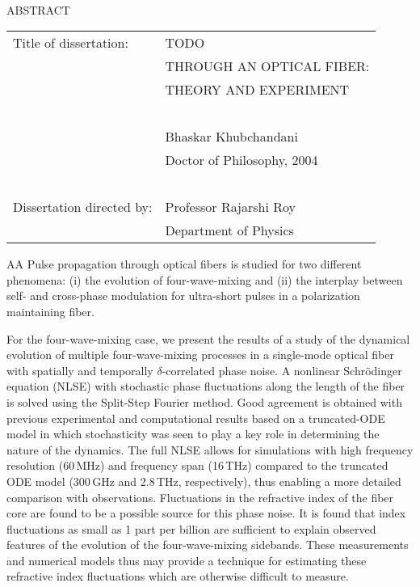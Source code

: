 
\hbox{\ }

\renewcommand{\baselinestretch}{1}
\small \normalsize

\begin{center}
\large{{ABSTRACT}}

\vspace{3em}

\end{center}
\hspace{-.15in}
\begin{tabular}{ll}
Title of dissertation:    & {\large  TODO }\\
&                     {\large  THROUGH AN OPTICAL FIBER:} \\
&                     {\large  THEORY AND EXPERIMENT} \\
\ \\
&                          {\large  Bhaskar Khubchandani} \\
&                           {\large Doctor of Philosophy, 2004} \\
\ \\
Dissertation directed by: & {\large  Professor Rajarshi Roy} \\
&               {\large  Department of Physics } \\
\end{tabular}

\vspace{3em}

\renewcommand{\baselinestretch}{2}
\large \normalsize

AA Pulse propagation through optical fibers is studied for two different phenomena: (i) the evolution of four-wave-mixing and (ii) the interplay between self- and cross-phase modulation for ultra-short pulses in a polarization maintaining fiber.

For the four-wave-mixing case, we present the results of a study of the dynamical evolution of multiple four-wave-mixing processes in a single-mode optical fiber with spatially and temporally $\delta$-correlated phase noise. A nonlinear Schr\"odinger equation (NLSE) with stochastic phase fluctuations along the length of the fiber is solved using the Split-Step Fourier method. Good agreement is obtained with previous experimental and computational results based on a truncated-ODE model in which stochasticity was seen to play a key role in determining the nature of the dynamics. The full NLSE allows for simulations with high frequency resolution (60\,MHz) and frequency span (16\,THz) compared to the truncated ODE model (300\,GHz and 2.8\,THz, respectively), thus enabling a more detailed comparison with observations. Fluctuations in the refractive index of the fiber core are found to be a possible source for this phase noise. It is found that index fluctuations as small as 1 part per billion are sufficient to explain observed features of the evolution of the four-wave-mixing sidebands. These measurements and numerical models thus may provide a technique for estimating these refractive index fluctuations which are otherwise difficult to measure.

